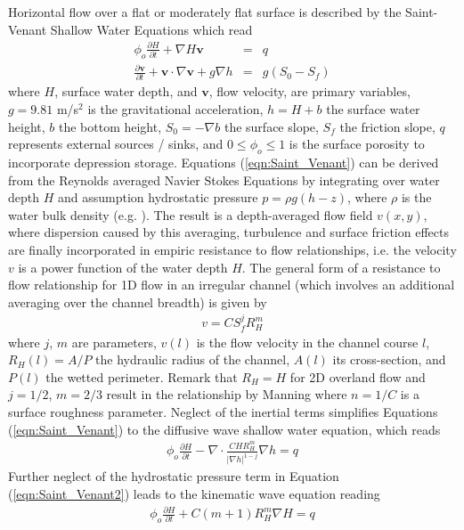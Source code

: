 Horizontal flow over a flat or moderately flat surface is described by the Saint-Venant Shallow Water Equations which read
%
\begin{eqnarray}
\phi_o\frac{\partial H}{\partial t} + \nabla H \mathbf v &= & q \label{eqn:Saint_Venant}\\
\frac{\partial \mathbf v}{\partial t} + \mathbf v \cdot \nabla \mathbf v  + g  \nabla h &= & g (S_0 - S_f)
\nonumber
\end{eqnarray}
%
where $H$, surface water depth, and $\mathbf v$, flow velocity, are primary variables, $g= 9.81$ m/s$^2$ is the gravitational acceleration, 
$h = H + b$ the surface water height, $b$ the bottom height, $S_0 = - \nabla b$ the surface slope, $S_f$ the friction slope, $q$ represents external sources / sinks, 
and $0 \leq \phi_o \leq 1$ is the surface porosity to incorporate depression storage. 
%
Equations (\ref{eqn:Saint_Venant}) can be derived from the
Reynolds averaged Navier Stokes Equations by integrating over water depth $H$ and assumption hydrostatic pressure $p= \rho g (h - z)$, where $\rho$ is the water bulk density (e.g. \cite{FerSal:04}).
The result is a depth-averaged flow field $v(x,y)$, where dispersion caused by this averaging, turbulence and surface friction effects are finally incorporated
in empiric resistance to flow relationships, i.e. the velocity $v$ is a power function of the water depth $H$. 
The general form of a resistance to flow relationship for 1D flow in an irregular channel (which involves an additional averaging over the channel breadth) is given by
%
\begin{eqnarray}
v = CS_f^j R_H^m \label{eqn:resistance}
\end{eqnarray}
%
where $j$, $m$ are parameters, $v(l)$ is the flow velocity in the channel course $l$, $R_H(l) = A /P$ the hydraulic radius of the channel, $A(l)$ its cross-section, and $P(l)$ the wetted perimeter. Remark that $R_H = H$ for 2D overland flow and $j = 1/2$, $m= 2/3$ result in the relationship by Manning where $n=1/C$ is a surface roughness parameter.
%
Neglect of the inertial terms simplifies Equations (\ref{eqn:Saint_Venant}) to the diffusive wave shallow water equation, which reads
%
\begin{eqnarray}
\phi_o\frac{\partial H}{\partial t}
- \nabla\cdot  \frac{C H R_H^m}{|\nabla h|^{1-j}}\nabla h
= q
\label{eqn:DiffusiveWave}
\end{eqnarray}
%
Further neglect of the hydrostatic pressure term in Equation (\ref{eqn:Saint_Venant2}) leads to the kinematic wave equation reading
%
\begin{eqnarray}
\phi_o\frac{\partial H}{\partial t}
+ C (m+1) R_H^m \nabla H
= q
\label{eqn:KinematicWave}
\end{eqnarray}
